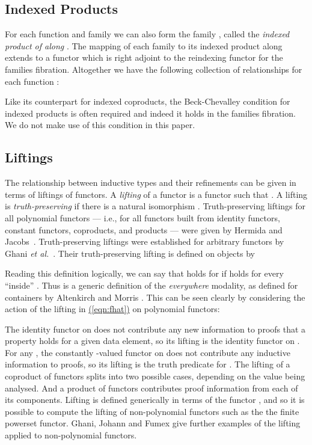 \documentclass{LMCS}
\newcommand{\parenref}[1]{\hyperref[#1]{(\ref*{#1})}}
\begin{document}
\subsection{Indexed Products}\label{sec:indexed-products}

For each function  and family  we can also form
the family , called the {\em indexed product of  along }.  The
mapping of each family to its indexed product along  extends to a
functor  which is right adjoint
to the reindexing functor  for the families fibration. Altogether
we have the following collection of relationships for each function :


\noindent
Like its counterpart for indexed coproducts, the Beck-Chevalley
condition for indexed products is often required and indeed it holds
in the families fibration. We do not make use of this condition in
this paper.

\subsection{Liftings}\label{sec:fibrational-ind}

The relationship between inductive types and their refinements can be
given in terms of liftings of functors. A {\em lifting} of a functor
 is a functor 
such that .  A lifting is {\em
  truth-preserving} if there is a natural isomorphism . Truth-preserving liftings for all
polynomial functors --- i.e., for all functors built from identity
functors, constant functors, coproducts, and products --- were given
by Hermida and Jacobs~\cite{hermida98structural}.  Truth-preserving
liftings were established for arbitrary functors by Ghani \emph{et
  al.}~\cite{ghani10induction}.  Their truth-preserving lifting
 is defined on objects by


\noindent
Reading this definition logically, we can say that 
holds for  if  holds for every  ``inside''
. Thus  is a generic definition of the \emph{everywhere}
modality, as defined for containers by Altenkirch and Morris
\cite{alten09indexed}. This can be seen clearly by considering the
action of the lifting in \parenref{eqn:fhat} on polynomial functors:

The identity functor on  does not contribute any new information
to proofs that a property holds for a given data element, so its
lifting is the identity functor on . For any , the
constantly -valued functor  on  does not contribute any
inductive information to proofs, so its lifting is the truth predicate
 for . The lifting of a coproduct of functors splits into
two possible cases, depending on the value being analysed. And a
product of functors contributes proof information from each of its
components. Lifting is defined generically in terms of the functor
, and so it is possible to compute the lifting of non-polynomial
functors such as the the finite powerset functor. Ghani, Johann and
Fumex \cite{ghani10induction} give further examples of the lifting
 applied to non-polynomial functors.
\end{document}
